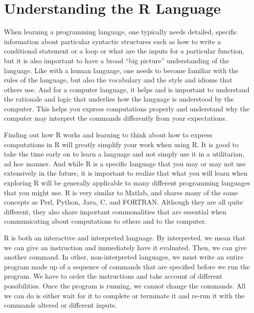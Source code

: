 \section{Understanding the R Language}\label{sec:languages}
When learning a programming language, one typically needs detailed,
specific information about particular syntactic structures such as how
to write a conditional statement or a loop or what are the inputs for
a particular function, but it is also important to have a broad ``big
picture'' understanding of the language.  Like with a human language,
one needs to become familiar with the rules of the language, but also
the vocabulary and the style and idioms that others use.  And for a
computer language, it helps and is important to understand the
rationale and logic that underlies how the language is understood by
the computer.  This helps you express computations properly and
understand why the computer may interpret the commands differently
from your expectations.

Finding out how R works and learning to think about how to express
computations in R will greatly simplify your work when using R. It is
good to take the time early on to learn a language and not simply use
it in a utilitarian, ad hoc manner.  And while R is a specific
language that you may or may not use extensively in the future, it is
important to realize that what you will learn when exploring R will be
generally applicable to many different programming languages that you
might use.  R is very similar to Matlab, and shares many of the same
concepts as Perl, Python, Java, C, and FORTRAN.  Although they are all
quite different, they also share important commonalities that are
essential when communicating about computations to others and to the
computer.

R is both an interactive and interpreted language.  By interpreted, we
mean that we can give an instruction and immediately have it
evaluated.  Then, we can give another command.  In other,
non-interpreted languages, we must write an entire program made up of
a sequence of commands that are specified before we run the program.
We have to order the instructions and take account of different
possibilities.  Once the program is running, we cannot change the
commands.  All we can do is either wait for it to complete or
terminate it and re-run it with the commands altered or different
inputs.


